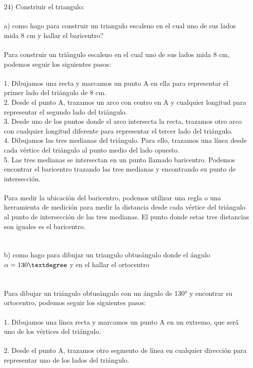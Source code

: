 \documentclass{article}
\begin{document}
24) Constriuir el triangulo: \\
\\
a) como hago para construir un triangulo escaleno en el cual uno de sus lados mida 8 cm y hallar el baricentro? \\
\\
Para construir un triángulo escaleno en el cual uno de sus lados mida 8 cm, podemos seguir los siguientes pasos:\\
\\
1. Dibujamos una recta y marcamos un punto A en ella para representar el primer lado del triángulo de 8 cm.\\
2. Desde el punto A, trazamos un arco con centro en A y cualquier longitud para representar el segundo lado del triángulo.\\
3. Desde uno de los puntos donde el arco intersecta la recta, trazamos otro arco con cualquier longitud diferente para representar el tercer lado del triángulo.\\
4. Dibujamos las tres medianas del triángulo. Para ello, trazamos una línea desde cada vértice del triángulo al punto medio del lado opuesto.\\
5. Las tres medianas se intersectan en un punto llamado baricentro. Podemos encontrar el baricentro trazando las tres medianas y encontrando su punto de intersección.\\
\\
Para medir la ubicación del baricentro, podemos utilizar una regla o una herramienta de medición para medir la distancia desde cada vértice del triángulo al punto de intersección de las tres medianas. El punto donde estas tres distancias son iguales es el baricentro.\\
\\
\\
b) como hago para dibujar un triangulo obtusángulo donde el ángulo $\alpha=130\textdegree$ y en el hallar el ortocentro\\
\\
\\
Para dibujar un triángulo obtusángulo con un ángulo de 130° y encontrar su ortocentro, podemos seguir los siguientes pasos:\\
\\
1. Dibujamos una línea recta y marcamos un punto A en un extremo, que será uno de los vértices del triángulo.\\
\\
2. Desde el punto A, trazamos otro segmento de línea en cualquier dirección para representar uno de los lados del triángulo.\\
\end{document}
